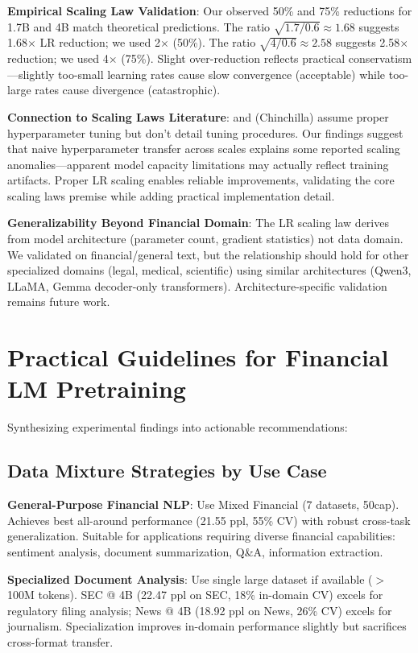 \textbf{Empirical Scaling Law Validation}: Our observed 50\% and 75\% reductions for 1.7B and 4B match theoretical predictions. The ratio $\sqrt{1.7/0.6} \approx 1.68$ suggests 1.68$\times$ LR reduction; we used 2$\times$ (50\%). The ratio $\sqrt{4/0.6} \approx 2.58$ suggests 2.58$\times$ reduction; we used 4$\times$ (75\%). Slight over-reduction reflects practical conservatism—slightly too-small learning rates cause slow convergence (acceptable) while too-large rates cause divergence (catastrophic).

\textbf{Connection to Scaling Laws Literature}: \textcite{kaplan2020scaling} and \textcite{hoffmann2022training} (Chinchilla) assume proper hyperparameter tuning but don't detail tuning procedures. Our findings suggest that naive hyperparameter transfer across scales explains some reported scaling anomalies—apparent model capacity limitations may actually reflect training artifacts. Proper LR scaling enables reliable improvements, validating the core scaling laws premise while adding practical implementation detail.

\textbf{Generalizability Beyond Financial Domain}: The LR scaling law derives from model architecture (parameter count, gradient statistics) not data domain. We validated on financial/general text, but the relationship should hold for other specialized domains (legal, medical, scientific) using similar architectures (Qwen3, LLaMA, Gemma decoder-only transformers). Architecture-specific validation remains future work.

\section{Practical Guidelines for Financial LM Pretraining}

Synthesizing experimental findings into actionable recommendations:

\subsection{Data Mixture Strategies by Use Case}

\textbf{General-Purpose Financial NLP}: Use Mixed Financial (7 datasets, 50cap). Achieves best all-around performance (21.55 ppl, 55\% CV) with robust cross-task generalization. Suitable for applications requiring diverse financial capabilities: sentiment analysis, document summarization, Q\&A, information extraction.

\textbf{Specialized Document Analysis}: Use single large dataset if available ($>$ 100M tokens). SEC @ 4B (22.47 ppl on SEC, 18\% in-domain CV) excels for regulatory filing analysis; News @ 4B (18.92 ppl on News, 26\% CV) excels for journalism. Specialization improves in-domain performance slightly but sacrifices cross-format transfer.

